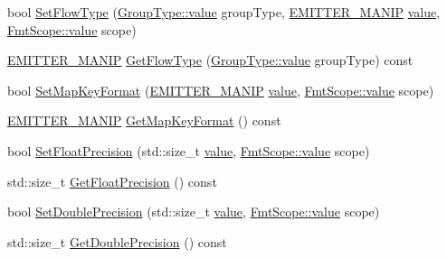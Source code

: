\begin{DoxyCompactItemize}
\item 
bool \mbox{\hyperlink{class_y_a_m_l_1_1_emitter_state_a962c29e23608432b4217c5383cd59c88}{Set\+Flow\+Type}} (\mbox{\hyperlink{struct_y_a_m_l_1_1_group_type_aab9271cd8999a6694cb10670e6a5496f}{Group\+Type\+::value}} group\+Type, \mbox{\hyperlink{namespace_y_a_m_l_a67c320aa50d3de7ecba1d0b8775dd684}{E\+M\+I\+T\+T\+E\+R\+\_\+\+M\+A\+N\+IP}} \mbox{\hyperlink{glad_8h_a03aff08f73d7fde3d1a08e0abd8e84fa}{value}}, \mbox{\hyperlink{struct_y_a_m_l_1_1_fmt_scope_a58c967eadfafdc79f62cd5c59ec2b1fe}{Fmt\+Scope\+::value}} scope)
\item 
\mbox{\hyperlink{namespace_y_a_m_l_a67c320aa50d3de7ecba1d0b8775dd684}{E\+M\+I\+T\+T\+E\+R\+\_\+\+M\+A\+N\+IP}} \mbox{\hyperlink{class_y_a_m_l_1_1_emitter_state_a45e041721ad2817c8a72d00bb6883de7}{Get\+Flow\+Type}} (\mbox{\hyperlink{struct_y_a_m_l_1_1_group_type_aab9271cd8999a6694cb10670e6a5496f}{Group\+Type\+::value}} group\+Type) const
\item 
bool \mbox{\hyperlink{class_y_a_m_l_1_1_emitter_state_acf57f7e6528cd8bf543ab761256d41e0}{Set\+Map\+Key\+Format}} (\mbox{\hyperlink{namespace_y_a_m_l_a67c320aa50d3de7ecba1d0b8775dd684}{E\+M\+I\+T\+T\+E\+R\+\_\+\+M\+A\+N\+IP}} \mbox{\hyperlink{glad_8h_a03aff08f73d7fde3d1a08e0abd8e84fa}{value}}, \mbox{\hyperlink{struct_y_a_m_l_1_1_fmt_scope_a58c967eadfafdc79f62cd5c59ec2b1fe}{Fmt\+Scope\+::value}} scope)
\item 
\mbox{\hyperlink{namespace_y_a_m_l_a67c320aa50d3de7ecba1d0b8775dd684}{E\+M\+I\+T\+T\+E\+R\+\_\+\+M\+A\+N\+IP}} \mbox{\hyperlink{class_y_a_m_l_1_1_emitter_state_abc411e5f3433f4b89887e73e3a27a714}{Get\+Map\+Key\+Format}} () const
\item 
bool \mbox{\hyperlink{class_y_a_m_l_1_1_emitter_state_ab0f30356a4ff723c84b01e0b4d1e7ff4}{Set\+Float\+Precision}} (std\+::size\+\_\+t \mbox{\hyperlink{glad_8h_a03aff08f73d7fde3d1a08e0abd8e84fa}{value}}, \mbox{\hyperlink{struct_y_a_m_l_1_1_fmt_scope_a58c967eadfafdc79f62cd5c59ec2b1fe}{Fmt\+Scope\+::value}} scope)
\item 
std\+::size\+\_\+t \mbox{\hyperlink{class_y_a_m_l_1_1_emitter_state_aefd02d2539f0f15d86727046c592aa91}{Get\+Float\+Precision}} () const
\item 
bool \mbox{\hyperlink{class_y_a_m_l_1_1_emitter_state_a16f6e7ce69d138b8b10d766e92a05443}{Set\+Double\+Precision}} (std\+::size\+\_\+t \mbox{\hyperlink{glad_8h_a03aff08f73d7fde3d1a08e0abd8e84fa}{value}}, \mbox{\hyperlink{struct_y_a_m_l_1_1_fmt_scope_a58c967eadfafdc79f62cd5c59ec2b1fe}{Fmt\+Scope\+::value}} scope)
\item 
std\+::size\+\_\+t \mbox{\hyperlink{class_y_a_m_l_1_1_emitter_state_ab2b1cb7b56700603a575097df1a00c45}{Get\+Double\+Precision}} () const
\end{DoxyCompactItemize}


